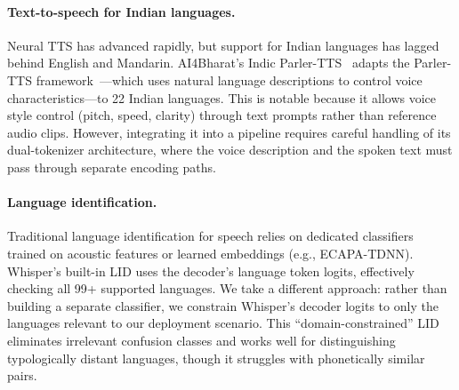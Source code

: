 \paragraph{Text-to-speech for Indian languages.}
Neural TTS has advanced rapidly, but support for Indian languages has lagged behind English and Mandarin. AI4Bharat's Indic Parler-TTS~\cite{ai4bharat_indic_parler} adapts the Parler-TTS framework~\cite{lyth2024parlertts}---which uses natural language descriptions to control voice characteristics---to 22 Indian languages. This is notable because it allows voice style control (pitch, speed, clarity) through text prompts rather than reference audio clips. However, integrating it into a pipeline requires careful handling of its dual-tokenizer architecture, where the voice description and the spoken text must pass through separate encoding paths.

\paragraph{Language identification.}
Traditional language identification for speech relies on dedicated classifiers trained on acoustic features or learned embeddings (e.g., ECAPA-TDNN). Whisper's built-in LID uses the decoder's language token logits, effectively checking all 99+ supported languages. We take a different approach: rather than building a separate classifier, we constrain Whisper's decoder logits to only the languages relevant to our deployment scenario. This ``domain-constrained'' LID eliminates irrelevant confusion classes and works well for distinguishing typologically distant languages, though it struggles with phonetically similar pairs.
